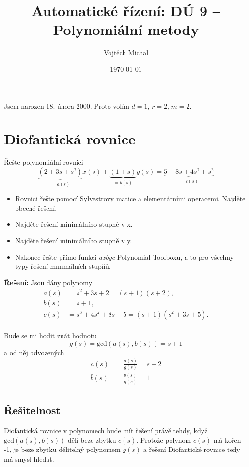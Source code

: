 \documentclass[twoside]{article}
\title{Automatické řízení: DÚ 9 -- Polynomiální metody}
\author{Vojtěch Michal}
\date{\today}
\begin{document}
\maketitle

Jsem narozen 18. února 2000. Proto volím $d = 1$, $r = 2$, $m = 2$.

\section{Diofantická rovnice}

Řešte polynomiální rovnici
\begin{equation}
	\label{eq:zadani}
	\underbrace{(2 + 3s + s^2)}_{=a(s)}x(s) + \underbrace{(1 + s)}_{=b(s)}y(s) = \underbrace{5 + 8s + 4s^2 + s^3}_{=c(s)}
\end{equation}
\begin{itemize}
	\item Rovnici řešte pomocí Sylvestrovy matice a elementárními operacemi. Najděte obecné řešení.
	\item Najděte řešení minimálního stupně v x.
	\item Najděte řešení minimálního stupně v y.
	\item Nakonec řešte přímo funkcí \textit{axbyc} Polynomial Toolboxu, a to pro všechny typy řešení
	minimálních stupňů.
\end{itemize}

\textbf{Řešení:}
Jsou dány polynomy
\begin{equation}
	\begin{align}
		a(s) &= s^2 + 3s + 2 = (s+1)(s+2), \\
		b(s) &= s + 1, \\
		c(s) &= s^3 + 4s^2 + 8s + 5 = (s+1)(s^2 + 3s + 5).
	\end{align}
\end{equation} \\
Bude se mi hodit znát hodnotu
\begin{equation}
	g(s) = \text{gcd}(a(s), b(s)) = s + 1
\end{equation}
a od něj odvozených
\begin{equation}
	\begin{align}
		\bar{a}(s) &= \frac{a(s)}{g(s)} = s + 2 \\
		\bar{b}(s) &= \frac{b(s)}{g(s)} = 1 \\
	\end{align}
\end{equation}

\subsection{Řešitelnost}
Diofantická rovnice v polynomech bude mít řešení právě tehdy, když $\text{gcd}(a(s), b(s))$ dělí beze zbytku $c(s)$. Protože polynom $c(s)$ má kořen -1,
je beze zbytku dělitelný polynomem $g(s)$ a řešení Diofantické rovnice tedy má smysl hledat.
\end{document}
